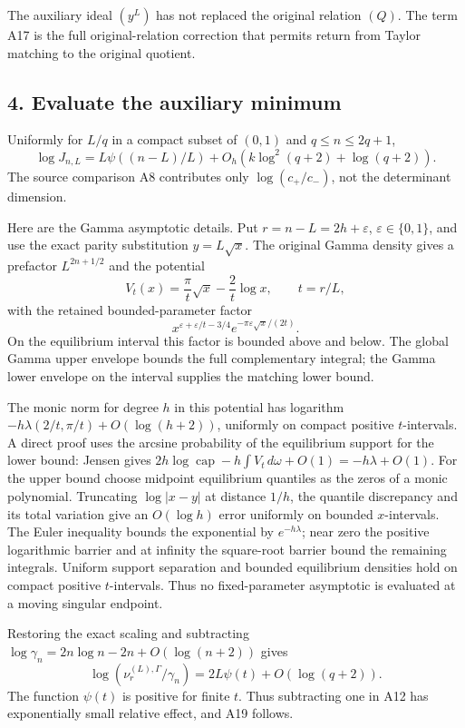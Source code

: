 \documentclass[11pt]{article}
\begin{document}
The auxiliary ideal \((y^L)\) has not replaced the original relation \((Q)\). The term A17 is the full original-relation correction that permits return from Taylor matching to the original quotient.

\subsection{4. Evaluate the auxiliary minimum}\label{evaluate-the-auxiliary-minimum}

Uniformly for \(L/q\) in a compact subset of \((0,1)\) and \(q\le n\le2q+1\), \[
 \boxed{
 \log J_{n,L}
 =L\psi((n-L)/L)
 +O_h(k\log^2(q+2)+\log(q+2)).
 }\tag{A19}
\] The source comparison A8 contributes only \(\log(c_+/c_-)\), not the determinant dimension.

Here are the Gamma asymptotic details. Put \(r=n-L=2h+\varepsilon\), \(\varepsilon\in\{0,1\}\), and use the exact parity substitution \(y=L\sqrt x\). The original Gamma density gives a prefactor \(L^{2n+1/2}\) and the potential \[
 V_t(x)=\frac\pi t\sqrt x-\frac2t\log x,\qquad t=r/L,
\] with the retained bounded-parameter factor \[
 x^{\varepsilon+\varepsilon/t-3/4}
          e^{-\pi\varepsilon\sqrt x/(2t)}.
\] On the equilibrium interval this factor is bounded above and below. The global Gamma upper envelope bounds the full complementary integral; the Gamma lower envelope on the interval supplies the matching lower bound.

The monic norm for degree \(h\) in this potential has logarithm \(-h\lambda(2/t,\pi/t)+O(\log(h+2))\), uniformly on compact positive \(t\)-intervals. A direct proof uses the arcsine probability of the equilibrium support for the lower bound: Jensen gives \(2h\log\operatorname{cap}-h\int V_t\,d\omega+O(1)
=-h\lambda+O(1)\). For the upper bound choose midpoint equilibrium quantiles as the zeros of a monic polynomial. Truncating \(\log|x-y|\) at distance \(1/h\), the quantile discrepancy and its total variation give an \(O(\log h)\) error uniformly on bounded \(x\)-intervals. The Euler inequality bounds the exponential by \(e^{-h\lambda}\); near zero the positive logarithmic barrier and at infinity the square-root barrier bound the remaining integrals. Uniform support separation and bounded equilibrium densities hold on compact positive \(t\)-intervals. Thus no fixed-parameter asymptotic is evaluated at a moving singular endpoint.

Restoring the exact scaling and subtracting \(\log\gamma_n=2n\log n-2n+O(\log(n+2))\) gives \[
 \log(\nu_r^{(L),\Gamma}/\gamma_n)
 =2L\psi(t)+O(\log(q+2)).
\] The function \(\psi(t)\) is positive for finite \(t\). Thus subtracting one in A12 has exponentially small relative effect, and A19 follows.
\end{document}
